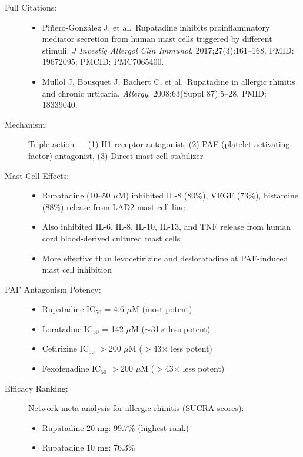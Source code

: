 \begin{description}
    \item[Full Citations:]
    \begin{itemize}
        \item Piñero-González J, et al.\ Rupatadine inhibits proinflammatory mediator secretion from human mast cells triggered by different stimuli. \textit{J Investig Allergol Clin Immunol}. 2017;27(3):161--168. PMID: 19672095; PMCID: PMC7065400.
        \item Mullol J, Bousquet J, Bachert C, et al.\ Rupatadine in allergic rhinitis and chronic urticaria. \textit{Allergy}. 2008;63(Suppl 87):5--28. PMID: 18339040.
    \end{itemize}
    \item[Mechanism:] Triple action --- (1) H1 receptor antagonist, (2) PAF (platelet-activating factor) antagonist, (3) Direct mast cell stabilizer
    \item[Mast Cell Effects:]
    \begin{itemize}
        \item Rupatadine (10--50 $\mu$M) inhibited IL-8 (80\%), VEGF (73\%), histamine (88\%) release from LAD2 mast cell line
        \item Also inhibited IL-6, IL-8, IL-10, IL-13, and TNF release from human cord blood-derived cultured mast cells
        \item More effective than levocetirizine and desloratadine at PAF-induced mast cell inhibition
    \end{itemize}
    \item[PAF Antagonism Potency:]
    \begin{itemize}
        \item Rupatadine IC$_{50}$ = 4.6 $\mu$M (most potent)
        \item Loratadine IC$_{50}$ = 142 $\mu$M ($\sim$31$\times$ less potent)
        \item Cetirizine IC$_{50}$ $>$200 $\mu$M ($>$43$\times$ less potent)
        \item Fexofenadine IC$_{50}$ $>$200 $\mu$M ($>$43$\times$ less potent)
    \end{itemize}
    \item[Efficacy Ranking:] Network meta-analysis for allergic rhinitis (SUCRA scores):
    \begin{itemize}
        \item Rupatadine 20 mg: 99.7\% (highest rank)
        \item Rupatadine 10 mg: 76.3\%

\end{itemize}
\end{description}
